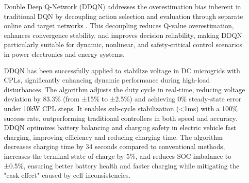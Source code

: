 Double Deep Q-Network (DDQN) addresses the overestimation bias inherent in traditional DQN by decoupling action selection and evaluation through separate online and target networks \cite{wang2016dueling}. This decoupling reduces Q-value overestimation, enhances convergence stability, and improves decision reliability, making DDQN particularly suitable for dynamic, nonlinear, and safety-critical control scenarios in power electronics and energy systems.

DDQN has been successfully applied to stabilize voltage in DC microgrids with CPLs, significantly enhancing dynamic performance during high-load disturbances. The algorithm adjusts the duty cycle in real-time, reducing voltage deviation by 83.3\% (from ±15\% to ±2.5\%) and achieving 0\% steady-state error under 10kW CPL steps. It enables sub-cycle stabilization (<1ms) with a 100\% success rate, outperforming traditional controllers in both speed and accuracy. DDQN optimizes battery balancing and charging safety in electric vehicle fast charging, improving efficiency and reducing charging time. The algorithm decreases charging time by 34 seconds compared to conventional methods, increases the terminal state of charge by 5\%, and reduces SOC imbalance to ±0.5\%, ensuring better battery health and faster charging while mitigating the "cask effect" caused by cell inconsistencies.



